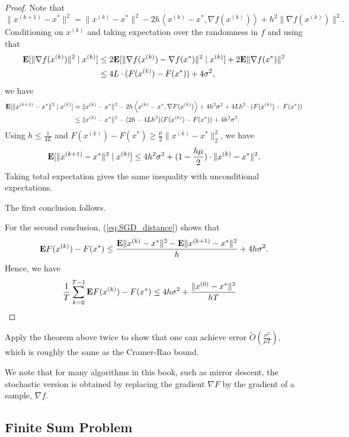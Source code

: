 \begin{proof}
Note that
\[
\|x^{(k+1)}-x^{*}\|^{2}=\|x^{(k)}-x^{*}\|^{2}-2h\left\langle x^{(k)}-x^{*},\nabla f(x^{(k)})\right\rangle +h^{2}\|\nabla f(x^{(k)})\|^{2}.
\]
Conditioning on $x^{(k)}$ and taking expectation over the randomness
in $f$ and using that 
\begin{align*}
\mathbf{E}[\|\nabla f(x^{(k)})\|^{2}\mid x^{(k)}] & \leq2\mathbf{E}[\|\nabla f(x^{(k)})-\nabla f(x^{*})\|^{2}\mid x^{(k)}]+2\mathbf{E}\|\nabla f(x^{*})\|^{2}\\
 & \leq4L\cdot(F(x^{(k)})-F(x^{*}))+4\sigma^{2},
\end{align*}
we have
\begin{align}
\mathbf{E}[\|x^{(k+1)}-x^{*}\|^{2}\mid x^{(k)}] & =\|x^{(k)}-x^{*}\|^{2}-2h\left\langle x^{(k)}-x^{*},\nabla F(x^{(k)})\right\rangle +4h^{2}\sigma^{2}+4Lh^{2}\cdot(F(x^{(k)})-F(x^{*}))\nonumber \\
 & \leq\|x^{(k)}-x^{*}\|^{2}-(2h-4Lh^{2})(F(x^{(k)})-F(x^{*}))+4h^{2}\sigma^{2}.\label{eq:SGD_distance}
\end{align}
Using $h\leq\frac{1}{4L}$ and $F(x^{(k)})-F(x^{*})\geq\frac{\mu}{2}\|x^{(k)}-x^{*}\|^{2}_{2}$,
we have
\[
\mathbf{E}[\|x^{(k+1)}-x^{*}\|^{2}\mid x^{(k)}]\leq4h^{2}\sigma^{2}+(1-\frac{h\mu}{2})\cdot\|x^{(k)}-x^{*}\|^{2}.
\]
Taking total expectation gives the same inequality with unconditional
expectations. 

The first conclusion follows.

For the second conclusion, (\ref{eq:SGD_distance}) shows that
\[
\mathbf{E} F(x^{(k)})-F(x^{*})\leq\frac{\mathbf{E}\|x^{(k)}-x^{*}\|^{2}-\mathbf{E}\|x^{(k+1)}-x^{*}\|^{2}}{h}+4h\sigma^{2}.
\]
Hence, we have
\begin{align*}
\frac{1}{T}\sum^{T-1}_{k=0}\mathbf{E} F(x^{(k)})-F(x^{*}) & \leq4h\sigma^{2}+\frac{\|x^{(0)}-x^{*}\|^{2}}{hT}
\end{align*}
\end{proof}
\begin{xca}
Apply the theorem above twice to show that one can achieve error $\tilde{O}(\frac{\sigma^{2}}{\mu T})$,
which is roughly the same as the Cramer-Rao bound. 
\end{xca}

We note that for many algorithms in this book, such as mirror descent,
the stochastic version is obtained by replacing the gradient $\nabla F$
by the gradient of a sample, $\nabla f$.

\subsection{Finite Sum Problem}

